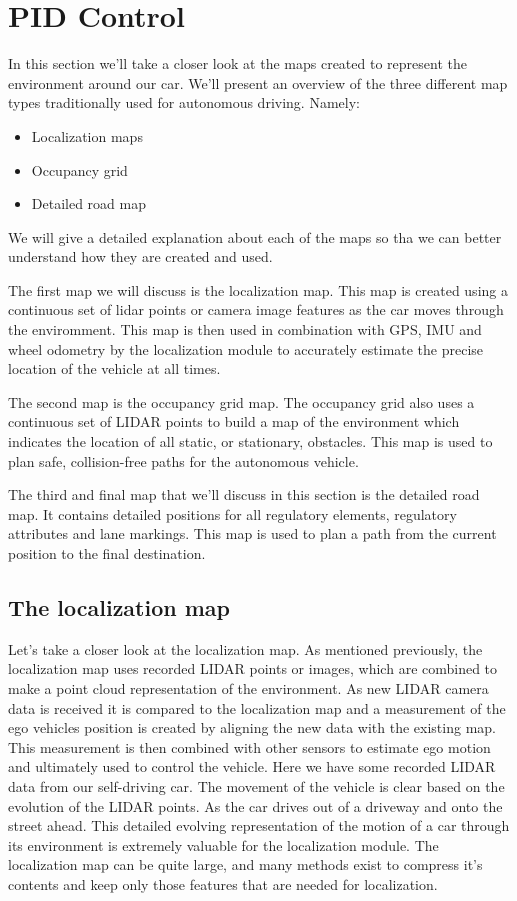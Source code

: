 \section{PID Control}
\label{pid_control}

In this section we'll take a closer look at the maps created to represent the environment around our car. We'll present an overview of the three
different map types traditionally used for autonomous driving. Namely:

\begin{itemize}
\item Localization maps 
\item Occupancy grid
\item Detailed road map
\end{itemize}

We will give  a detailed explanation about each of the maps so tha we can better understand how they are created
and used. 

The first map we will discuss is the localization map. This map is created using
a continuous set of lidar points or camera image features as the car
moves through the enviromment. This map is then used in
combination with GPS, IMU and wheel odometry by the localization module to accurately estimate the precise
location of the vehicle at all times. 

The second map is the occupancy grid map. The occupancy grid also uses a continuous
set of LIDAR points to build a map of the environment which indicates
the location of all static, or stationary, obstacles. This map is used to plan safe,
collision-free paths for the autonomous vehicle. 

The third and final map that we'll discuss
in this section is the detailed road map. It contains detailed positions for all regulatory elements,
regulatory attributes and lane markings. This map is used to plan a path from the
current position to the final destination. 


\subsection{The localization map}
\label{localization_map}

Let's take a closer look
at the localization map. As mentioned previously, the localization map uses
recorded LIDAR points or images, which are combined to make a point
cloud representation of the environment. As new LIDAR camera data is received it
is compared to the localization map and a measurement of the ego vehicles
position is created by aligning the new data with the existing map. This measurement is then combined with
other sensors to estimate ego motion and ultimately used to control the vehicle. Here we have some recorded LIDAR
data from our self-driving car. The movement of the vehicle is clear based
on the evolution of the LIDAR points. As the car drives out of a driveway and
onto the street ahead. This detailed evolving representation
of the motion of a car through its environment is extremely valuable for
the localization module. The localization map can be quite large,
and many methods exist to compress it's contents and keep only those features
that are needed for localization.


